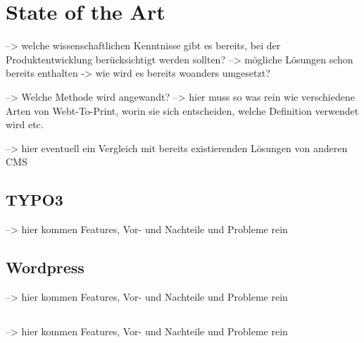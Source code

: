 \chapter{State of the Art} \label{stateOfTheArt}

--> welche wissenschaftlichen Kenntnisse gibt es bereits, bei der Produktentwicklung berücksichtigt werden sollten?
    --> mögliche Lösungen schon bereits enthalten -> wie wird es bereits woanders umgesetzt?

--> Welche Methode wird angewandt?
    --> hier muss so was rein wie verschiedene Arten von Webt-To-Print, worin sie sich entscheiden, welche Definition verwendet wird etc.

--> hier eventuell ein Vergleich mit bereits existierenden Lösungen von anderen CMS


\section{TYPO3} \label{stand:Typo3}
--> hier kommen Features, Vor- und Nachteile und Probleme rein

\section{Wordpress} \label{stand:Wordpress}
--> hier kommen Features, Vor- und Nachteile und Probleme rein

\section{\edith} \label{stand:Edith}
--> hier kommen Features, Vor- und Nachteile und Probleme rein